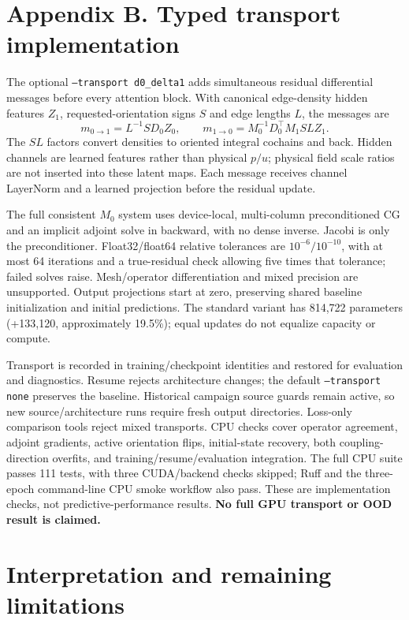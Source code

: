\documentclass[10pt,a4paper]{article}
\newcommand{\pct}{\%}
\begin{document}
\clearpage\section*{Appendix B. Typed transport implementation}

The optional \texttt{--transport d0\_delta1} adds simultaneous residual differential
messages before every attention block. With canonical edge-density hidden features
$Z_1$, requested-orientation signs $S$ and edge lengths $L$, the messages are
\[
 m_{0\to1}=L^{-1}S D_0Z_0,\qquad
 m_{1\to0}=M_0^{-1}D_0^\top M_1SLZ_1.
\]
The $SL$ factors convert densities to oriented integral cochains and back.
Hidden channels are learned features rather than physical $p/u$; physical field
scale ratios are not inserted into these latent maps. Each message receives
channel LayerNorm and a learned projection before the residual update.

The full consistent $M_0$ system uses device-local, multi-column preconditioned
CG and an implicit adjoint solve in backward, with no dense inverse. Jacobi is
only the preconditioner. Float32/float64 relative tolerances are $10^{-6}/10^{-10}$,
with at most 64 iterations and a true-residual check allowing five times that
tolerance; failed solves raise. Mesh/operator differentiation and mixed precision
are unsupported. Output projections start at zero, preserving shared baseline
initialization and initial predictions. The standard variant has 814,722 parameters
(+133,120, approximately 19.5\pct); equal updates do not equalize capacity or compute.

Transport is recorded in training/checkpoint identities and restored for evaluation
and diagnostics. Resume rejects architecture changes; the default
\texttt{--transport none} preserves the baseline. Historical campaign source guards
remain active, so new source/architecture runs require fresh output directories.
Loss-only comparison tools reject mixed transports. CPU checks cover operator
agreement, adjoint gradients, active orientation flips, initial-state recovery,
both coupling-direction overfits, and training/resume/evaluation integration.
The full CPU suite passes 111 tests, with three CUDA/backend checks skipped;
Ruff and the three-epoch command-line CPU smoke workflow also pass.
These are implementation checks, not predictive-performance results.
\textbf{No full GPU transport or OOD result is claimed.}

\section*{Interpretation and remaining limitations}
\end{document}
